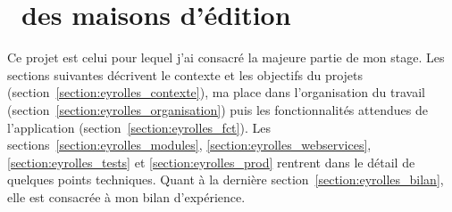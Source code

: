\section{\aintranet\ des maisons d'édition \aey}
\label{eyrolles}

Ce projet est celui pour lequel j'ai consacré la majeure partie de mon stage. Les sections suivantes décrivent le contexte et les objectifs du projets (section~\ref{section:eyrolles_contexte}), ma place dans l'organisation du travail (section~\ref{section:eyrolles_organisation}) puis les fonctionnalités attendues de l'application (section~\ref{section:eyrolles_fct}). Les sections~\ref{section:eyrolles_modules}, \ref{section:eyrolles_webservices}, \ref{section:eyrolles_tests} et \ref{section:eyrolles_prod} rentrent dans le détail de quelques points techniques. Quant à la dernière section~\ref{section:eyrolles_bilan}, elle est consacrée à mon bilan d'expérience.

















